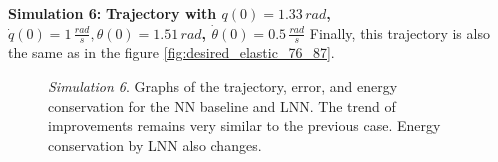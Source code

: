 \documentclass[a4paper]{article}
\begin{document}
\textbf{Simulation 6:} \textbf{Trajectory with $q(0)=1.33\, rad$, $\dot{q}(0)=1\, \frac{rad}{s}, \theta(0)=1.51\, rad$, $\dot{\theta}(0)=0.5\, \frac{rad}{s}$}
Finally, this trajectory is also the same as in the figure \ref{fig:desired_elastic_76_87}.

\begin{figure}
    \centering
    \qquad
    \caption{\textit{Simulation 6}. Graphs of the trajectory, error, and energy conservation for the NN baseline and LNN. The trend of improvements remains very similar to the previous case. Energy conservation by LNN also changes.}
    \label{fig:elastic_700_76_87}
\end{figure}
\end{document}
